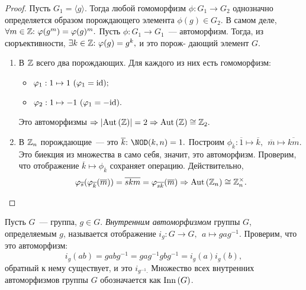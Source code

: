         \begin{proof}
            Пусть ${G_1 = \langle g \rangle.}$ Тогда любой гомоморфизм ${\phi : G_1 \rightarrow G_2}$ однозначно определяется образом порождающего элемента ${\phi(g) \in G_2.}$ В самом деле, ${\forall m \in \mathbb{Z}{:}{ } \  \varphi(g^m) = \varphi(g)^m.}$ Пусть ${\phi : G_1 \rightarrow G_1}$~--- автоморфизм. Тогда, из сюръективности, ${\exists k \in \mathbb{Z}{:}{ } \  \varphi(g) = g^k,}$ и это порож- дающий элемент $G$.
            \begin{enumerate}
            \setlength\itemsep{0.1em}
                \item В $\mathbb{Z}$ всего два порождающих. Для каждого из них есть гомоморфизм:
                \begin{itemize}
                \setlength\itemsep{0.1em}
                    \item ${\varphi_1 : 1 \mapsto 1 \ (\varphi_1 = \mathrm{id});}$
                    \item ${\varphi_2 : 1 \mapsto -1 \ (\varphi_1 = -\mathrm{id}).}$
                \end{itemize}
                Это автоморфизмы ${\Rightarrow |\mathrm{Aut} \,(\mathbb{Z})| = 2 \Rightarrow \mathrm{Aut} \,(\mathbb{Z}) \cong \mathbb{Z}_2.}$
                \item В $\mathbb{Z}_n$ порождающие~--- это ${\overline{k}\suchthat \NOD(k,n) = 1.}$ \newline
                Построим ${\phi_{\overline{k}} : \overline{1} \mapsto \overline{k}, \ \ \overline{m} \mapsto \overline{km}.}$ Это биекция из множества в само себя, значит, это автоморфизм. Проверим, что отображение ${\overline{k} \mapsto \phi_{\overline{k}}}$ сохраняет операцию. Действительно,
                \begin{equation*}
                    \varphi_{\overline{s}}(\varphi_{\overline{k}}(\overline{m})) = \overline{skm} = \varphi_{\overline{sk}}(\overline{m}) \Rightarrow \mathrm{Aut} \,(\mathbb{Z}_n) \cong \mathbb{Z}^\times_n. \qedhere
                \end{equation*}
            \end{enumerate}
          \end{proof}
          \newpage
          \begin{definition}
              Пусть $G$~--- группа, ${g \in G.}$ \textit{Внутренним автоморфизмом} группы $G$, определяемым $g$, называется отображение ${i_g : G \rightarrow G, \ \ a \mapsto gag^{-1}.}$\newline
              Проверим, что это автоморфизм:
              \begin{equation*}
                  i_g(ab) = gabg^{-1} = gag^{-1}gbg^{-1} = i_g(a)i_g(b),
              \end{equation*}
              обратный к нему существует, и это $i_{g^{-1}.}$\newline
              Множество всех внутренних автоморфизмов группы $G$ обозначается как $\mathrm{Inn} \,(G)$.
          \end{definition}
